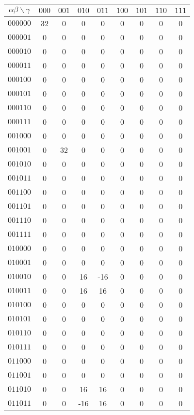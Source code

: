 \documentclass[10pt]{article}
\begin{document}
\tiny
\begin{center}
\begin{longtable}{c|cccccccc}
$\alpha\beta \backslash \gamma$ & $000$ & $001$ & $010$ & $011$ & $100$ & $101$ & $110$ & $111$ \\
\hline
$000000$ & 32 & 0 & 0 & 0 & 0 & 0 & 0 & 0 \\
$000001$ & 0 & 0 & 0 & 0 & 0 & 0 & 0 & 0 \\
$000010$ & 0 & 0 & 0 & 0 & 0 & 0 & 0 & 0 \\
$000011$ & 0 & 0 & 0 & 0 & 0 & 0 & 0 & 0 \\
$000100$ & 0 & 0 & 0 & 0 & 0 & 0 & 0 & 0 \\
$000101$ & 0 & 0 & 0 & 0 & 0 & 0 & 0 & 0 \\
$000110$ & 0 & 0 & 0 & 0 & 0 & 0 & 0 & 0 \\
$000111$ & 0 & 0 & 0 & 0 & 0 & 0 & 0 & 0 \\
$001000$ & 0 & 0 & 0 & 0 & 0 & 0 & 0 & 0 \\
$001001$ & 0 & 32 & 0 & 0 & 0 & 0 & 0 & 0 \\
$001010$ & 0 & 0 & 0 & 0 & 0 & 0 & 0 & 0 \\
$001011$ & 0 & 0 & 0 & 0 & 0 & 0 & 0 & 0 \\
$001100$ & 0 & 0 & 0 & 0 & 0 & 0 & 0 & 0 \\
$001101$ & 0 & 0 & 0 & 0 & 0 & 0 & 0 & 0 \\
$001110$ & 0 & 0 & 0 & 0 & 0 & 0 & 0 & 0 \\
$001111$ & 0 & 0 & 0 & 0 & 0 & 0 & 0 & 0 \\
$010000$ & 0 & 0 & 0 & 0 & 0 & 0 & 0 & 0 \\
$010001$ & 0 & 0 & 0 & 0 & 0 & 0 & 0 & 0 \\
$010010$ & 0 & 0 & 16 & -16 & 0 & 0 & 0 & 0 \\
$010011$ & 0 & 0 & 16 & 16 & 0 & 0 & 0 & 0 \\
$010100$ & 0 & 0 & 0 & 0 & 0 & 0 & 0 & 0 \\
$010101$ & 0 & 0 & 0 & 0 & 0 & 0 & 0 & 0 \\
$010110$ & 0 & 0 & 0 & 0 & 0 & 0 & 0 & 0 \\
$010111$ & 0 & 0 & 0 & 0 & 0 & 0 & 0 & 0 \\
$011000$ & 0 & 0 & 0 & 0 & 0 & 0 & 0 & 0 \\
$011001$ & 0 & 0 & 0 & 0 & 0 & 0 & 0 & 0 \\
$011010$ & 0 & 0 & 16 & 16 & 0 & 0 & 0 & 0 \\
$011011$ & 0 & 0 & -16 & 16 & 0 & 0 & 0 & 0 \\

\end{longtable}
\end{center}
\end{document}
